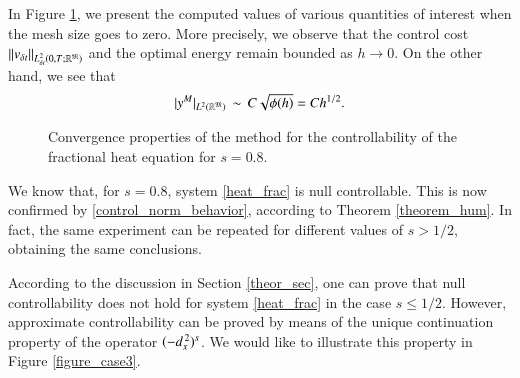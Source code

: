 In Figure \ref{figure_case1}, we present the computed values of various quantities of interest when the mesh size goes to zero. More precisely, we observe that the control cost $\|v_{\delta t}\|_{L^2_{\delta t}(0,T;\mathbb R^{\mathfrak{M}})}$ and the optimal energy remain bounded as $h\to 0$. On the other hand, we see that 
\begin{align}\label{control_norm_behavior}
	|y^M|_{L^2(\mathbb{R}^{\mathfrak{M}})}\,\sim\,C\sqrt{\phi(h)}=Ch^{1/2}. 
\end{align}

\begin{figure}[h]
  \centering
{}
\caption{Convergence properties of the method for the controllability of the fractional heat equation for $s=0.8$.}\label{figure_case1}
\end{figure}

We know that, for $s=0.8$, system \eqref{heat_frac} is null controllable. This is now confirmed by \eqref{control_norm_behavior}, according to Theorem \ref{theorem_hum}.  In fact, the same experiment can be repeated for different values of $s>1/2$, obtaining the same conclusions. 

According to the discussion in Section \ref{theor_sec}, one can prove that null controllability does not hold for system \eqref{heat_frac} in the case $s\leq 1/2$. However, approximate controllability can be proved by means of the unique continuation property of the operator $(-d_x^{\,2})^{s}$. We would like to illustrate this property in Figure \ref{figure_case3}.

